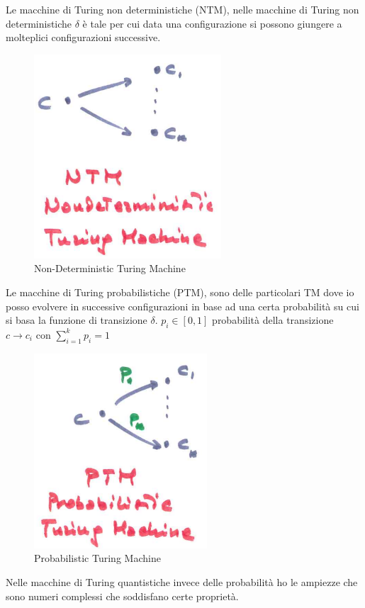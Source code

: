 \documentclass{article}
\begin{document}
Le macchine di Turing non deterministiche (NTM), nelle macchine di Turing non deterministiche
$\delta$ è tale per cui data una configurazione si possono giungere a molteplici configurazioni
successive.
\begin{figure}[H]
    \centering
    \caption{Non-Deterministic Turing Machine}
    \includegraphics[scale=0.6]{images/NTM.png}
\end{figure}
Le macchine di Turing probabilistiche (PTM), sono delle particolari TM dove io posso evolvere
in successive configurazioni in base ad una certa probabilità su cui si basa la funzione
di transizione $\delta$.
$p_i\in[0,1]$ probabilità della transizione $c\rightarrow c_i$ con $\sum_{i=1}^k p_i=1$
\begin{figure}[H]
    \centering
    \caption{Probabilistic Turing Machine}
    \includegraphics[scale=0.6]{images/PTM.png}
\end{figure}
Nelle macchine di Turing quantistiche invece delle probabilità ho le ampiezze che sono
numeri complessi che soddisfano certe proprietà.
\end{document}
